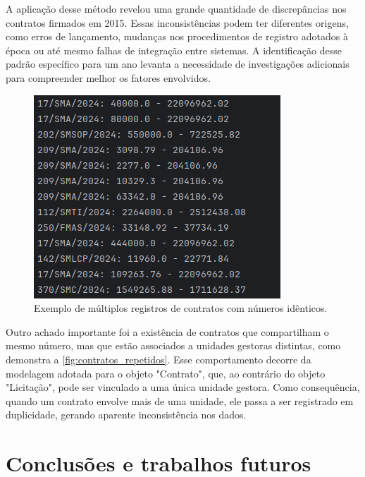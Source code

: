 \documentclass[
	12pt,				%
	oneside,			%
	a4paper,			%
	chapter=TITLE,		%
	section=TITLE,		%
	english,			%
	brazil				%
	]{abntex2}
\begin{document}
A aplicação desse método revelou uma grande quantidade de discrepâncias nos contratos firmados em 2015. Essas inconsistências podem ter diferentes origens, como erros de lançamento, mudanças nos procedimentos de registro adotados à época ou até mesmo falhas de integração entre sistemas. A identificação desse padrão específico para um ano levanta a necessidade de investigações adicionais para compreender melhor os fatores envolvidos.

\begin{figure}[h]
	\begin{center}
		\caption{\label{fig:contratos_repetidos}Exemplo de múltiplos registros de contratos com números idênticos.}
		\includegraphics{images/contratos_numeros_repetidos.png} %
	\end{center}
\end{figure}

Outro achado importante foi a existência de contratos que compartilham o mesmo número, mas que estão associados a unidades gestoras distintas, como demonstra a \autoref{fig:contratos_repetidos}. Esse comportamento decorre da modelagem adotada para o objeto "Contrato", que, ao contrário do objeto "Licitação", pode ser vinculado a uma única unidade gestora. Como consequência, quando um contrato envolve mais de uma unidade, ele passa a ser registrado em duplicidade, gerando aparente inconsistência nos dados.

\chapter{Conclusões e trabalhos futuros}
\label{cap:Conclusoes}
\end{document}
